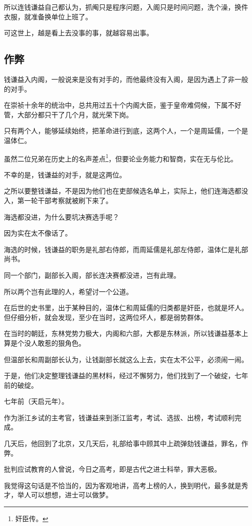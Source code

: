 \begin{multicols}{\theparacolNo}
		所以连钱谦益自己都认为，抓阄只是程序问题，入阁只是时间问题，洗个澡，换件衣服，就准备换单位上班了。

		可这世上，越是看上去没事的事，就越容易出事。

		\subsection{作弊}
		钱谦益入内阁，一般说来是没有对手的，而他最终没有入阁，是因为遇上了非一般的对手。

		在崇祯十余年的统治中，总共用过五十个内阁大臣，鉴于皇帝难伺候，下属不好管，大部分都只干了几个月，就光荣下岗。

		只有两个人，能够延续始终，把革命进行到底，这两个人，一个是周延儒，一个是温体仁。

		虽然二位兄弟在历史上的名声差点\footnote{奸臣传。}，但要论业务能力和智商，实在无与伦比。

		不幸的是，钱谦益的对手，就是这两位。

		之所以要整钱谦益，不是因为他们也在吏部候选名单上，实际上，他们连海选都没入，第一轮干部考察就被刷下来了。

		海选都没进，为什么要坑决赛选手呢？

		因为实在太不像话了。

		海选的时候，钱谦益的职务是礼部右侍郎，而周延儒是礼部左侍郎，温体仁是礼部尚书。

		同一个部门，副部长入阁，部长连决赛都没进，岂有此理。

		所以两个岂有此理的人，希望讨一个公道。

		在后世的史书里，出于某种目的，温体仁和周延儒的归类都是奸臣，也就是坏人。但仔细分析，就会发现，至少在当时，这两位坏人，都是弱势群体。

		在当时的朝廷，东林党势力极大，内阁和六部，大都是东林派，所以钱谦益基本上算是个没人敢惹的狠角色。

		但温部长和周副部长认为，让钱副部长就这么上去，实在太不公平，必须闹一闹。

		于是，他们决定整理钱谦益的黑材料，经过不懈努力，他们找到了一个破绽，七年前的破绽。

		七年前（天启元年）。

		作为浙江乡试的主考官，钱谦益来到浙江监考，考试、选拔、出榜，考试顺利完成。

		几天后，他回到了北京，又几天后，礼部给事中顾其中上疏弹劾钱谦益，罪名，作弊。

		批判应试教育的人曾说，今日之高考，即是古代之进士科举，罪大恶极。

		我觉得这句话是不恰当的，因为客观地讲，高考上榜的人，换到明代，最多就是秀才，举人可以想想，进士可以做梦。


\end{multicols}
